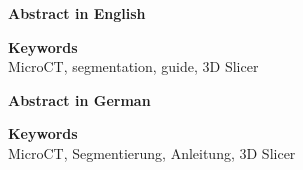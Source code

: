 
\newcommand*{\AbstractHead}[1]{%
	{\noindent\color{header-blue}\sffamily\Large\textbf{#1}}
	\vspace{10pt}\\
}%

\newcommand*{\SomeSpace}{%
	\vspace{\baselineskip}
}

\AbstractHead{Abstract in English}
\noindent
\normalsize
\lipsum[1]

\SomeSpace
\AbstractHead{Keywords}
\normalsize
\noindent
MicroCT, segmentation, guide, 3D Slicer

\glsresetall{}
\SomeSpace

\AbstractHead{Abstract in German}
\noindent
\normalsize
\lipsum[1]

\SomeSpace
\AbstractHead{Keywords}
\normalsize
\noindent
MicroCT, Segmentierung, Anleitung, 3D Slicer

\glsresetall{}
